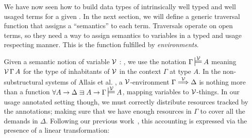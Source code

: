 We have now seen how to build data types of intrinsically well typed
and well usaged terms for a given . In the next
section, we will define a generic traversal function that assigns a
``semantics'' to each term. Traversals operate on open terms, so they
need a way to assign semantics to variables in a typed and usage
respecting manner. This is the function fulfilled by
\emph{environments}.

Given a semantic notion of variable $\mathcal V$ : , we
use the notation $\Gamma \sdtstile{}\V A$ meaning $\mathcal V\,\Gamma\,A$ for
the type of inhabitants of $\mathcal V$ in the context $\Gamma$ at type
$A$. In the non-substructural systems of Allais et al. \cite{AACMM21},
a $\mathcal V$-environment $\Gamma \stackrel{\mathcal V}\Longrightarrow \Delta$ is nothing more than a
function $\forall A \to \Delta \sqni A \to \Gamma \sdtstile{}\V A$,
mapping variables to $\mathcal V$-things. In our usage annotated setting
though, we must correctly distribute resources tracked by the
annotations; making sure that we have enough resources in $\Gamma$ to
cover all the demands in $\Delta$. Following our previous work~\cite{WA20},
this accounting is expressed via the presence of a linear
transformation:








